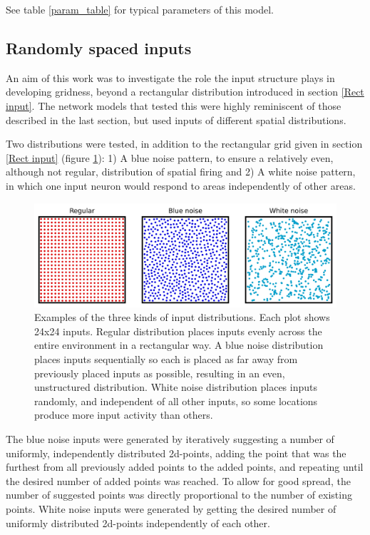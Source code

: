 \documentclass{article}
\begin{document}
    See table \ref{param_table} for typical parameters of this model.

    \subsection{Randomly spaced inputs} \label{Rand input}
    An aim of this work was to investigate the role the input structure plays in developing gridness, beyond a rectangular distribution introduced in section \ref{Rect input}. The network models that tested this were highly reminiscent of those described in the last section, but used inputs of different spatial distributions.
    
    Two distributions were tested, in addition to the rectangular grid given in section \ref{Rect input} (figure \ref{input_distribution}): 1) A blue noise pattern, to ensure a relatively even, although not regular, distribution of spatial firing and 2) A white noise pattern, in which one input neuron would respond to areas independently of other areas.

    \begin{figure}[H]
        \centering
        \begin{minipage}[t]{1\textwidth}
            \includegraphics[width=\textwidth]{distribution_plot.png}
        \end{minipage}
        \caption{Examples of the three kinds of input distributions. Each plot shows 24x24 inputs. Regular distribution places inputs evenly across the entire environment in a rectangular way. A blue noise distribution places inputs sequentially so each is placed as far away from previously placed inputs as possible, resulting in an even, unstructured distribution. White noise distribution places inputs randomly, and independent of all other inputs, so some locations produce more input activity than others.}
        \label{input_distribution}
    \end{figure}
    
    The blue noise inputs were generated by iteratively suggesting a number of uniformly, independently distributed 2d-points, adding the point that was the furthest from all previously added points to the added points, and repeating until the desired number of added points was reached. To allow for good spread, the number of suggested points was directly proportional to the number of existing points.
    White noise inputs were generated by getting the desired number of uniformly distributed 2d-points independently of each other.
\end{document}
